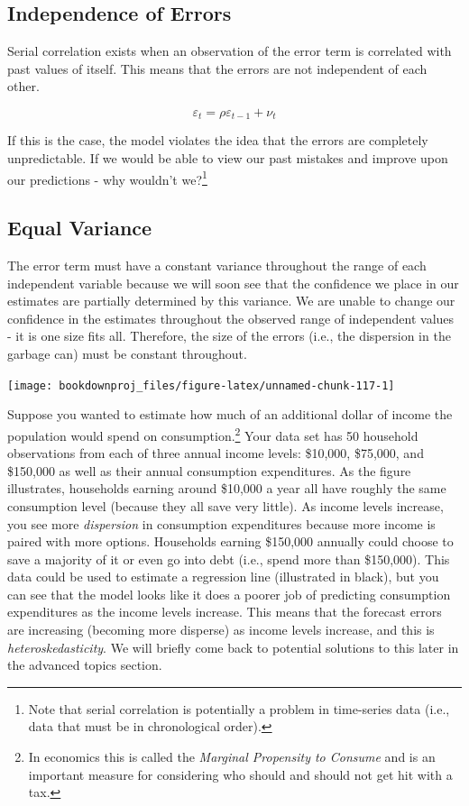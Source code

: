 \documentclass[
]{book}
\begin{document}
\subsection{Independence of Errors}\label{independence-of-errors}

Serial correlation exists when an observation of the error term is correlated with past values of itself. This means that the errors are not independent of each other.

\[\varepsilon_t=\rho \varepsilon_{t-1}+\nu_t\]

If this is the case, the model violates the idea that the errors are completely unpredictable. If we would be able to view our past mistakes and improve upon our predictions - why wouldn't we?\footnote{Note that serial correlation is potentially a problem in time-series data (i.e., data that must be in chronological order).}

\subsection{Equal Variance}\label{equal-variance}

The error term must have a constant variance throughout the range of each independent variable because we will soon see that the confidence we place in our estimates are partially determined by this variance. We are unable to change our confidence in the estimates throughout the observed range of independent values - it is one size fits all. Therefore, the size of the errors (i.e., the dispersion in the garbage can) must be constant throughout.

\begin{center}\texttt{[image: bookdownproj\_files/figure-latex/unnamed-chunk-117-1]} \end{center}

Suppose you wanted to estimate how much of an additional dollar of income the population would spend on consumption.\footnote{In economics this is called the \emph{Marginal Propensity to Consume} and is an important measure for considering who should and should not get hit with a tax.} Your data set has 50 household observations from each of three annual income levels: \$10,000, \$75,000, and \$150,000 as well as their annual consumption expenditures. As the figure illustrates, households earning around \$10,000 a year all have roughly the same consumption level (because they all save very little). As income levels increase, you see more \emph{dispersion} in consumption expenditures because more income is paired with more options. Households earning \$150,000 annually could choose to save a majority of it or even go into debt (i.e., spend more than \$150,000). This data could be used to estimate a regression line (illustrated in black), but you can see that the model looks like it does a poorer job of predicting consumption expenditures as the income levels increase. This means that the forecast errors are increasing (becoming more disperse) as income levels increase, and this is \emph{heteroskedasticity}. We will briefly come back to potential solutions to this later in the advanced topics section.
\end{document}
